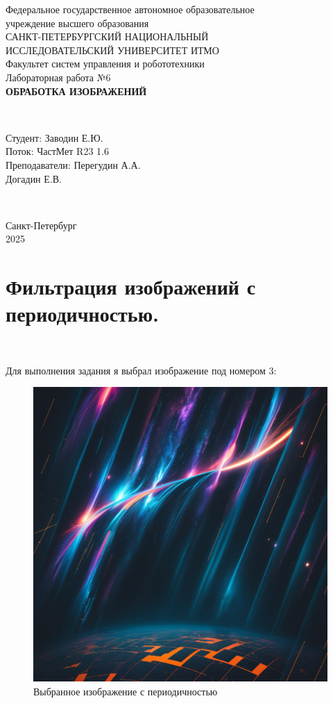 \documentclass[a4paper]{article}
\begin{document}
\begin{titlepage}
    \begin{center}
        Федеральное государственное автономное образовательное \\ учреждение высшего образования \\[6pt]
        САНКТ-ПЕТЕРБУРГСКИЙ НАЦИОНАЛЬНЫЙ \\ ИССЛЕДОВАТЕЛЬСКИЙ УНИВЕРСИТЕТ ИТМО \\[16pt]
        Факультет систем управления и робототехники \\[26em]
        Лабораторная работа №6 \\[0.5em]
        \textbf{ОБРАБОТКА ИЗОБРАЖЕНИЙ}
    \end{center}\,\\[10em]
    \begin{flushright}
        Студент: Заводин Е.Ю.\\
        Поток: ЧастМет R23 1.6 \\[0.5em]
        Преподаватели: Перегудин А.А.\\
        Догадин Е.В.
    \end{flushright}\,\\[6em]
    \begin{center}
        {\small Санкт-Петербург \\ 2025}
    \end{center}
\end{titlepage}
\setcounter{page}{2}
\tableofcontents\newpage

\section{Фильтрация изображений с периодичностью.}\

Для выполнения задания я выбрал изображение под номером 3:

\begin{figure}[H]
    \centering
    \includegraphics[width=0.51\linewidth]{3.png}
    \caption{Выбранное изображение с периодичностью}
\end{figure}\ 
\end{document}
